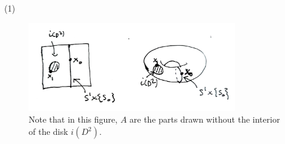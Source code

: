     \begin{solution}
        (1) 
        \begin{figure}[htpb]
            \centering
            \includegraphics[width=0.8\textwidth]{Figures/p11.jpeg}
            \caption{Note that 
            in this figure, $A$ are the parts drawn
        without the interior of the disk $i(D^2)$.}
            \label{fig:p11-jpeg}
        \end{figure}


\end{solution}
